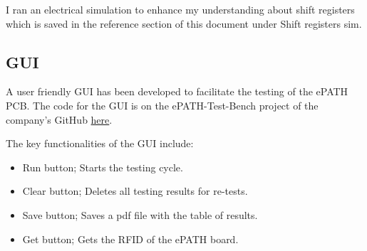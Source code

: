 I ran an electrical simulation to enhance my understanding about shift registers which is saved in the reference section of this document under Shift registers sim.



\subsection{GUI}
A user friendly GUI has been developed to facilitate the testing of the ePATH PCB. The code for the GUI is on the ePATH-Test-Bench project of the company's GitHub \href{https://github.com/pathfinder-medical/ePATH-Test-Bench}{here}.

The key functionalities of the GUI include:
\begin{itemize}
\item Run button; Starts the testing cycle.
\item Clear button; Deletes all testing results for re-tests.
\item Save button; Saves a pdf file with the table of results.
\item Get button; Gets the RFID of the ePATH board.
\end{itemize}
